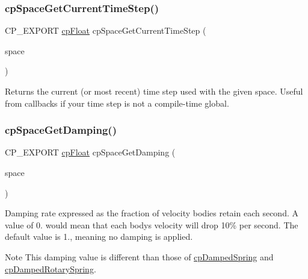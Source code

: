 \subsubsection{\texorpdfstring{cp\+Space\+Get\+Current\+Time\+Step()}{cpSpaceGetCurrentTimeStep()}}
{\footnotesize\ttfamily C\+P\+\_\+\+E\+X\+P\+O\+RT \mbox{\hyperlink{group__basic_types_gac1ed65573e035bf892505768c852d8d3}{cp\+Float}} cp\+Space\+Get\+Current\+Time\+Step (\begin{DoxyParamCaption}\item[{const \mbox{\hyperlink{structcp_space}{cp\+Space}} $\ast$}]{space }\end{DoxyParamCaption})}

Returns the current (or most recent) time step used with the given space. Useful from callbacks if your time step is not a compile-\/time global. \mbox{\label{group__cp_space_gac00ad0e4956e444fa23874fae68df3b7}} 
\subsubsection{\texorpdfstring{cp\+Space\+Get\+Damping()}{cpSpaceGetDamping()}}
{\footnotesize\ttfamily C\+P\+\_\+\+E\+X\+P\+O\+RT \mbox{\hyperlink{group__basic_types_gac1ed65573e035bf892505768c852d8d3}{cp\+Float}} cp\+Space\+Get\+Damping (\begin{DoxyParamCaption}\item[{const \mbox{\hyperlink{structcp_space}{cp\+Space}} $\ast$}]{space }\end{DoxyParamCaption})}

Damping rate expressed as the fraction of velocity bodies retain each second. A value of 0. would mean that each body\textquotesingle{}s velocity will drop 10\% per second. The default value is 1., meaning no damping is applied. \begin{DoxyNote}{Note}
This damping value is different than those of \mbox{\hyperlink{structcp_damped_spring}{cp\+Damped\+Spring}} and \mbox{\hyperlink{structcp_damped_rotary_spring}{cp\+Damped\+Rotary\+Spring}}. 
\end{DoxyNote}
\mbox{\label{group__cp_space_ga256c38475826c4c165999079929fe1e7}} 
